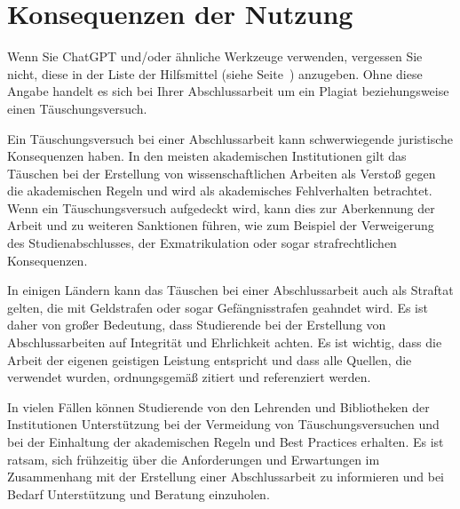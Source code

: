 
\section{Konsequenzen der Nutzung}
Wenn Sie ChatGPT und/oder ähnliche Werkzeuge verwenden, vergessen Sie nicht, diese in der Liste der Hilfsmittel (siehe Seite~\pageref{Tools}) anzugeben. Ohne diese Angabe handelt es sich bei Ihrer Abschlussarbeit um ein Plagiat beziehungsweise einen Täuschungsversuch.


Ein Täuschungsversuch bei einer Abschlussarbeit kann schwerwiegende juristische Konsequenzen haben. In den meisten akademischen Institutionen gilt das Täuschen bei der Erstellung von wissenschaftlichen Arbeiten als Verstoß gegen die akademischen Regeln und wird als akademisches Fehlverhalten betrachtet. Wenn ein Täuschungsversuch aufgedeckt wird, kann dies zur Aberkennung der Arbeit und zu weiteren Sanktionen führen, wie zum Beispiel der Verweigerung des Studienabschlusses, der Exmatrikulation oder sogar strafrechtlichen Konsequenzen.

In einigen Ländern kann das Täuschen bei einer Abschlussarbeit auch als Straftat gelten, die mit Geldstrafen oder sogar Gefängnisstrafen geahndet wird. Es ist daher von großer Bedeutung, dass Studierende bei der Erstellung von Abschlussarbeiten auf Integrität und Ehrlichkeit achten. Es ist wichtig, dass die Arbeit der eigenen geistigen Leistung entspricht und dass alle Quellen, die verwendet wurden, ordnungsgemäß zitiert und referenziert werden.

In vielen Fällen können Studierende von den Lehrenden und Bibliotheken der Institutionen Unterstützung bei der Vermeidung von Täuschungsversuchen und bei der Einhaltung der akademischen Regeln und Best Practices erhalten. Es ist ratsam, sich frühzeitig über die Anforderungen und Erwartungen im Zusammenhang mit der Erstellung einer Abschlussarbeit zu informieren und bei Bedarf Unterstützung und Beratung einzuholen.